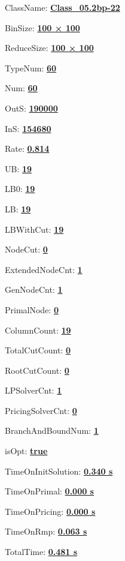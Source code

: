 \documentclass[11pt]{article}
\begin{document}
\pagestyle{empty}


ClassName: \underline{\textbf{Class_05.2bp-22}}
\par
BinSize: \underline{\textbf{100 × 100}}
\par
ReduceSize: \underline{\textbf{100 × 100}}
\par
TypeNum: \underline{\textbf{60}}
\par
Num: \underline{\textbf{60}}
\par
OutS: \underline{\textbf{190000}}
\par
InS: \underline{\textbf{154680}}
\par
Rate: \underline{\textbf{0.814}}
\par
UB: \underline{\textbf{19}}
\par
LB0: \underline{\textbf{19}}
\par
LB: \underline{\textbf{19}}
\par
LBWithCut: \underline{\textbf{19}}
\par
NodeCut: \underline{\textbf{0}}
\par
ExtendedNodeCnt: \underline{\textbf{1}}
\par
GenNodeCnt: \underline{\textbf{1}}
\par
PrimalNode: \underline{\textbf{0}}
\par
ColumnCount: \underline{\textbf{19}}
\par
TotalCutCount: \underline{\textbf{0}}
\par
RootCutCount: \underline{\textbf{0}}
\par
LPSolverCnt: \underline{\textbf{1}}
\par
PricingSolverCnt: \underline{\textbf{0}}
\par
BranchAndBoundNum: \underline{\textbf{1}}
\par
isOpt: \underline{\textbf{true}}
\par
TimeOnInitSolution: \underline{\textbf{0.340 s}}
\par
TimeOnPrimal: \underline{\textbf{0.000 s}}
\par
TimeOnPricing: \underline{\textbf{0.000 s}}
\par
TimeOnRmp: \underline{\textbf{0.063 s}}
\par
TotalTime: \underline{\textbf{0.481 s}}
\par
\newpage


\end{document}
